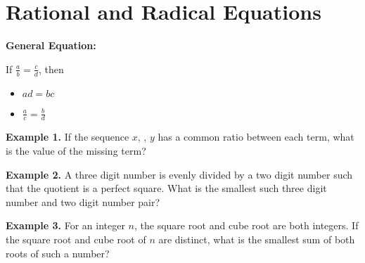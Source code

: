 \section[Rational \& Radical]{Rational and Radical Equations}

\bigskip
\textbf{General Equation:}

\bigskip
If $\frac{a}{b}=\frac{c}{d}$, then

\bigskip
\begin{itemize}[label=$\bullet$]
\item $ad=bc$

\bigskip
\item $\frac{a}{c}=\frac{b}{d}$
\end{itemize}

\vfill
\textbf{Example 1.} If the sequence $x$, \shortline, $y$ has a common ratio between each term, what is the value of the missing term?

\vfill
\textbf{Example 2.} A three digit number is evenly divided by a two digit number such that the quotient is a perfect square. What is the smallest such three digit number and two digit number pair?

\vfill
\textbf{Example 3.} For an integer $n$, the square root and cube root are both integers. If the square root and cube root of $n$ are distinct, what is the smallest sum of both roots of such a number?

